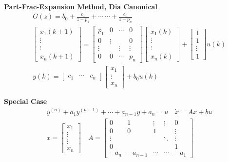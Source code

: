 \textbf{Part-Frac-Expansion Method, Dia Canonical} %
\vspace{-0.425cm}
\begin{align*}
& G(z) =  b_0 + \frac{c_1}{z-p_1} + \cdots \ \cdots + \frac{c_n}{z-p_n} \\
& \begin{bmatrix}
x_1(k+1) \\
\vdots \\
\vdots \\
x_n(k+1)
\end{bmatrix} =  \begin{bmatrix}
p_1     & 0       & \cdots  & 0      \\
0       & \vdots  &         & 0      \\
\vdots  &         &  \vdots & \vdots \\
0       & 0       &  \cdots & p_n
\end{bmatrix}\begin{bmatrix}
x_1(k) \\
\vdots \\
\vdots \\
x_n(k)
\end{bmatrix} + \begin{bmatrix}
1 \\
1 \\
\vdots \\
1
\end{bmatrix} u(k) \\
&  y(k) = \begin{bmatrix}
c_1 & \cdots & c_n
\end{bmatrix} \begin{bmatrix}
x_1    \\
\vdots \\
x_n
\end{bmatrix} + b_0 u(k)
\end{align*}

\textbf{Special Case} %
%
\vspace{-0.425cm}
\begin{align*}
& y^{(n)}+a_1y^{(n-1)}+ \cdots + a_{n-1}y+a_{n}=u \quad \dot{x} = Ax + bu  \\
& x = \begin{bmatrix}
x_1 \\
\vdots \\
\vdots \\
x_n
\end{bmatrix} \quad 
A = \begin{bmatrix}
0      & 1        &  \vdots & \vdots       & 0        \\
0      & 0        &  1      &              & \vdots   \\
\vdots &          &         & \ddots       & \vdots   \\
0      &          &         &              &  1       \\
-a_n   & -a_{n-1} &  \cdots & \cdots       & -a_1 
\end{bmatrix}
\end{align*}


